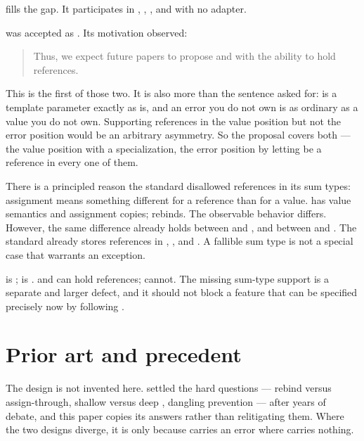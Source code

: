 \documentclass[a4paper,10pt,oneside,openany,final,article]{memoir}
\begin{document}
 fills the gap. It participates in ,
, , and  with no
adapter.

 was accepted as \cite{P2988R12}. Its motivation
observed:

\begin{quote}
  Thus, we expect future papers to propose  and
   with the ability to hold references.
\end{quote}

This is the first of those two. It is also more than the sentence asked for:
 is a template parameter exactly as  is, and an error you do
not own is as ordinary as a value you do not own. Supporting references in the
value position but not the error position would be an arbitrary asymmetry.
So the proposal covers both --- the value position with a specialization, the
error position by letting  be a reference in every one of them.

There is a principled reason the standard disallowed references in its sum
types: assignment means something different for a reference than for a value.
 has value semantics and assignment copies;
 rebinds. The observable behavior differs. However, the
same difference already holds between
 and , and between  and
. The standard already stores references in
, , and . A
fallible sum type is not a special case that warrants an exception.

 is ;  is
.  and  can hold references;
 cannot. The missing sum-type support is a separate and larger
defect, and it should not block a feature that can be specified precisely now
by following .

\chapter{Prior art and precedent}

The design is not invented here.  \cite{P2988R12} settled
the hard questions --- rebind versus assign-through, shallow versus deep
, dangling prevention --- after years of debate, and this paper
copies its answers rather than relitigating them. Where the two designs
diverge, it is only because  carries an error where
 carries nothing.
\end{document}
